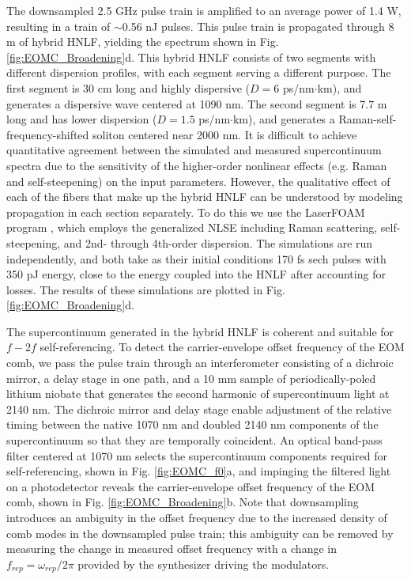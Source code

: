 The downsampled 2.5 GHz pulse train is amplified to an average power of 1.4 W, resulting in a train of $\sim$0.56 nJ pulses. This pulse train is propagated through 8 m of hybrid HNLF, yielding the spectrum shown in Fig. \ref{fig:EOMC_Broadening}d. This hybrid HNLF consists of two segments with different dispersion profiles, with each segment serving a different purpose. The first segment is 30 cm long and highly dispersive ($D=6$  ps/nm$\cdot$km), and generates a dispersive wave centered at 1090 nm. The second segment is 7.7 m long and has lower dispersion ($D=1.5$  ps/nm$\cdot$km), and generates a Raman-self-frequency-shifted soliton centered near 2000 nm. It is difficult to achieve quantitative agreement between the simulated and measured supercontinuum spectra due to the sensitivity of the higher-order nonlinear effects (e.g. Raman and self-steepening) on the input parameters. However, the qualitative effect of each of the fibers that make up the hybrid HNLF can be understood by modeling propagation in each section separately. To do this we use the LaserFOAM program \cite{Amorim2009}, which employs the generalized NLSE including Raman scattering, self-steepening, and 2nd- through 4th-order dispersion. The simulations are run independently, and both take as their initial conditions 170 fs sech pulses with 350 pJ energy, close to the energy coupled into the HNLF after accounting for losses. The results of these simulations are plotted in Fig. \ref{fig:EOMC_Broadening}d. 




The supercontinuum generated in the hybrid HNLF is coherent and suitable for $f-2f$ self-referencing. To detect the carrier-envelope offset frequency of the EOM comb, we pass the pulse train through an interferometer consisting of a dichroic mirror, a delay stage in one path, and a 10 mm sample of periodically-poled lithium niobate that generates the second harmonic of supercontinuum light at 2140 nm.  The dichroic mirror and delay stage enable adjustment of the relative timing between the native 1070 nm and doubled 2140 nm components of the supercontinuum so that they are temporally coincident. An optical band-pass filter centered at 1070 nm selects the supercontinuum components required for self-referencing, shown in Fig. \ref{fig:EOMC_f0}a, and impinging the filtered light on a photodetector reveals the carrier-envelope offset frequency of the EOM comb, shown in Fig. \ref{fig:EOMC_Broadening}b. Note that downsampling introduces an ambiguity in the offset frequency due to the increased density of comb modes in the downsampled pulse train; this ambiguity can be removed by measuring the change in measured offset frequency with a change in $f_{rep}=\omega_{rep}/2\pi$ provided by the synthesizer driving the modulators. 




